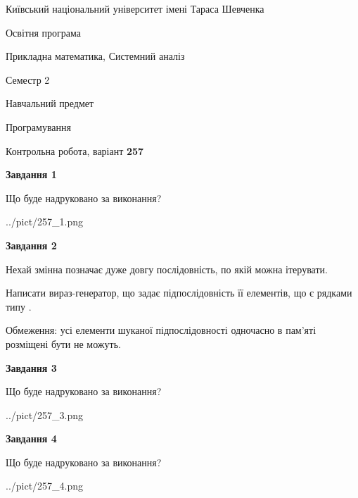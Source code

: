 \documentclass[12pt, ukrainian]{article}
\begin{document}
{{\begin {small}\par
{ \center  Київський національний університет імені Тараса Шевченка \par}
{\parbox {5 cm}{Освітня програма \hfill}{\parbox {8 cm}{Прикладна математика, Системний аналіз \hfill}}\parbox {5 cm}{\hfill Семестр 2}}\par
{\parbox {5 cm} {Навчальний предмет \hfill}\parbox {7 cm}{Програмування \hfill}\parbox {6cm}{\hfill}\par}\vspace{-7pt} \end{small}}{\center Контрольна робота, варіант  \No \textbf
{ 257 }\par}}
{
\begin {large}
{\begin {center}\textbf{Завдання 1}\end {center}}\par
Що буде надруковано за виконання?\par\par
\begin{center}
	{../pict/257_1.png}
\end{center}
\newpage

{\begin {center}\textbf{Завдання 2}\end {center}}\par
Нехай змінна  позначає дуже довгу послідовність, по якій можна ітерувати.

Написати вираз-генератор, що задає підпослідовність її елементів, що є рядками типу .

Обмеження: усі елементи шуканої підпослідовності одночасно в пам'яті розміщені бути не можуть.\par
\newpage

{\begin {center}\textbf{Завдання 3}\end {center}}\par
Що буде надруковано за виконання?
\begin{center}
	{../pict/257_3.png}
\end{center}
\newpage

{\begin {center}\textbf{Завдання 4}\end {center}}\par
Що буде надруковано за виконання?\par
\begin{center}
	{../pict/257_4.png}
\end{center}
\newpage


\end{large}}
\end{document}
